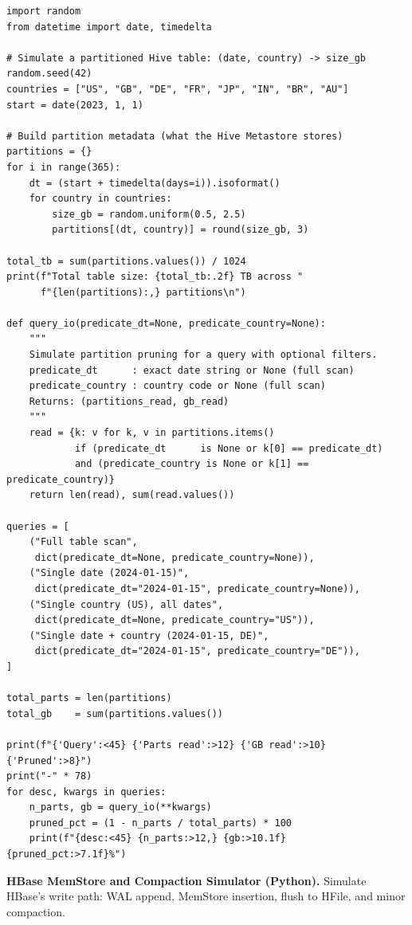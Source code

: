 \begin{lstlisting}[style=pyspark, caption={PE4.2: Hive partition pruning simulator}]
import random
from datetime import date, timedelta

# Simulate a partitioned Hive table: (date, country) -> size_gb
random.seed(42)
countries = ["US", "GB", "DE", "FR", "JP", "IN", "BR", "AU"]
start = date(2023, 1, 1)

# Build partition metadata (what the Hive Metastore stores)
partitions = {}
for i in range(365):
    dt = (start + timedelta(days=i)).isoformat()
    for country in countries:
        size_gb = random.uniform(0.5, 2.5)
        partitions[(dt, country)] = round(size_gb, 3)

total_tb = sum(partitions.values()) / 1024
print(f"Total table size: {total_tb:.2f} TB across "
      f"{len(partitions):,} partitions\n")

def query_io(predicate_dt=None, predicate_country=None):
    """
    Simulate partition pruning for a query with optional filters.
    predicate_dt      : exact date string or None (full scan)
    predicate_country : country code or None (full scan)
    Returns: (partitions_read, gb_read)
    """
    read = {k: v for k, v in partitions.items()
            if (predicate_dt      is None or k[0] == predicate_dt)
            and (predicate_country is None or k[1] == predicate_country)}
    return len(read), sum(read.values())

queries = [
    ("Full table scan",
     dict(predicate_dt=None, predicate_country=None)),
    ("Single date (2024-01-15)",
     dict(predicate_dt="2024-01-15", predicate_country=None)),
    ("Single country (US), all dates",
     dict(predicate_dt=None, predicate_country="US")),
    ("Single date + country (2024-01-15, DE)",
     dict(predicate_dt="2024-01-15", predicate_country="DE")),
]

total_parts = len(partitions)
total_gb    = sum(partitions.values())

print(f"{'Query':<45} {'Parts read':>12} {'GB read':>10} {'Pruned':>8}")
print("-" * 78)
for desc, kwargs in queries:
    n_parts, gb = query_io(**kwargs)
    pruned_pct = (1 - n_parts / total_parts) * 100
    print(f"{desc:<45} {n_parts:>12,} {gb:>10.1f} {pruned_pct:>7.1f}%")
\end{lstlisting}

\pe \textbf{HBase MemStore and Compaction Simulator (Python).}
Simulate HBase's write path: WAL append, MemStore insertion, flush to
HFile, and minor compaction.

